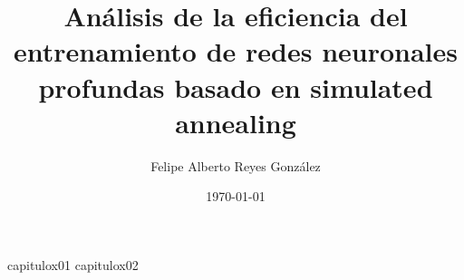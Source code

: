\documentclass[tesis]{tesis-usach}
\title{Análisis de la eficiencia del entrenamiento de redes neuronales profundas basado en simulated annealing}
\author{Felipe Alberto Reyes González}
\date{\today}
\begin{document}
	\renewcommand{\BOthers}[1]{et al.\hbox{}}%
	\maketitle
	\makecopyright
	\frontmatter
	\indice
	\mainmatter

	{capitulox01}
	{capitulox02}


	
	


\end{document}
